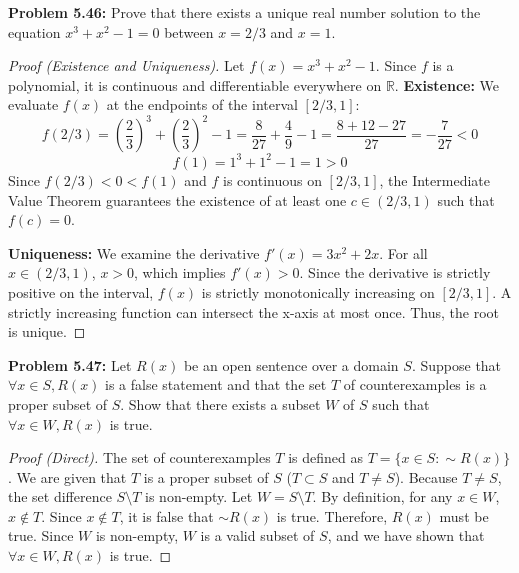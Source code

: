 \documentclass[11pt, a4paper]{article}
\theoremstyle{definition}
\theoremstyle{remark}
\newcommand{\R}{\mathbb{R}}
\begin{document}
\textbf{Problem 5.46:} Prove that there exists a unique real number solution to the equation $x^3+x^2-1=0$ between $x=2/3$ and $x=1$.
\begin{proof}[Proof (Existence and Uniqueness)]
    Let $f(x) = x^3 + x^2 - 1$. Since $f$ is a polynomial, it is continuous and differentiable everywhere on $\R$.
    \textbf{Existence:} We evaluate $f(x)$ at the endpoints of the interval $[2/3, 1]$:
    \[ f(2/3) = \left(\frac{2}{3}\right)^3 + \left(\frac{2}{3}\right)^2 - 1 = \frac{8}{27} + \frac{4}{9} - 1 = \frac{8+12-27}{27} = -\frac{7}{27} < 0 \]
    \[ f(1) = 1^3 + 1^2 - 1 = 1 > 0 \]
    Since $f(2/3) < 0 < f(1)$ and $f$ is continuous on $[2/3, 1]$, the Intermediate Value Theorem guarantees the existence of at least one $c \in (2/3, 1)$ such that $f(c) = 0$.
    
    \textbf{Uniqueness:} We examine the derivative $f'(x) = 3x^2 + 2x$. For all $x \in (2/3, 1)$, $x > 0$, which implies $f'(x) > 0$. Since the derivative is strictly positive on the interval, $f(x)$ is strictly monotonically increasing on $[2/3, 1]$. A strictly increasing function can intersect the x-axis at most once. Thus, the root is unique.
\end{proof}

\textbf{Problem 5.47:} Let $R(x)$ be an open sentence over a domain $S$. Suppose that $\forall x \in S, R(x)$ is a false statement and that the set $T$ of counterexamples is a proper subset of $S$. Show that there exists a subset $W$ of $S$ such that $\forall x \in W, R(x)$ is true.
\begin{proof}[Proof (Direct)]
    The set of counterexamples $T$ is defined as $T = \{x \in S : \sim R(x)\}$. We are given that $T$ is a proper subset of $S$ ($T \subset S$ and $T \neq S$). 
    Because $T \neq S$, the set difference $S \setminus T$ is non-empty. Let $W = S \setminus T$. 
    By definition, for any $x \in W$, $x \notin T$. Since $x \notin T$, it is false that $\sim R(x)$ is true. Therefore, $R(x)$ must be true. 
    Since $W$ is non-empty, $W$ is a valid subset of $S$, and we have shown that $\forall x \in W, R(x)$ is true.
\end{proof}
\end{document}

